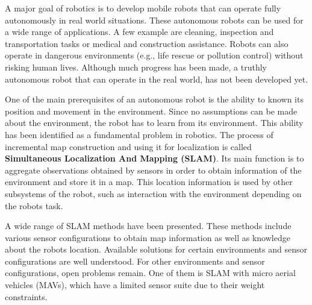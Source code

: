 A major goal of robotics is to develop mobile robots that can operate fully autonomously in real world situations.
These autonomous robots can be used for a wide range of applications.
A few example are cleaning, inspection and transportation tasks or medical and construction assistance.
Robots can also operate in dangerous environments (e.g., life rescue or pollution control) without risking human lives.
Although much progress has been made, a truthly autonomous robot that can operate in the real world, has not been developed yet.

One of the main prerequisites of an autonomous robot is the ability to known its position and movement in the environment.
Since no assumptions can be made about the environment, the robot has to learn from its environment.
This ability has been identified as a fundamental problem in robotics.
The process of incremental map construction and using it for localization is called \textbf{Simultaneous Localization And Mapping (SLAM)}.
Its main function is to aggregate observations obtained by sensors in order to obtain information of the environment and store it in a map.
This location information is used by other subsystems of the robot, such as interaction with the environment depending on the robots task.

A wide range of SLAM methods have been presented.
These methods include various sensor configurations to obtain map information as well as knowledge about the robots location.
Available solutions for certain environments and sensor configurations are well understood.
For other environments and sensor configurations, open problems remain.
One of them is SLAM with micro aerial vehicles (MAVs), which have a limited sensor suite due to their weight constraints.


